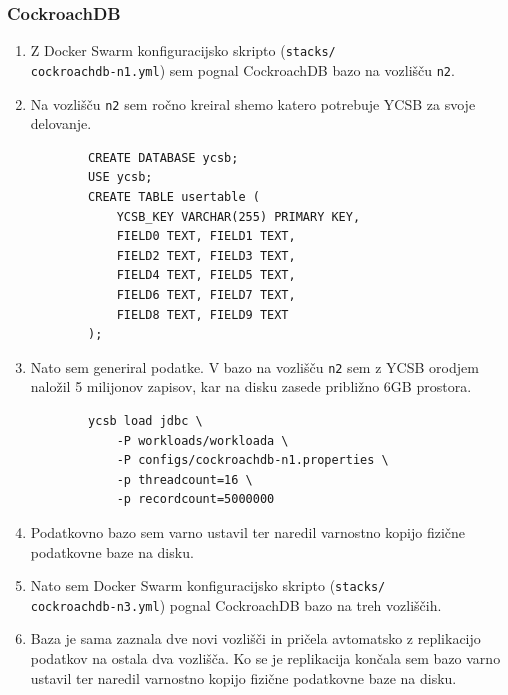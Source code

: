 \documentclass[a4paper, 12pt]{book}
\begin{document}
\subsubsection{CockroachDB}
\begin{enumerate}
    \item Z Docker Swarm konfiguracijsko skripto (\texttt{stacks/\\cockroachdb-n1.yml}) sem pognal CockroachDB bazo na vozlišču \texttt{n2}.
    \item Na vozlišču \texttt{n2} sem ročno kreiral shemo katero potrebuje YCSB za svoje delovanje.
    \begin{listing}[H]
    \begin{verbatim}
        CREATE DATABASE ycsb;
        USE ycsb;
        CREATE TABLE usertable (
            YCSB_KEY VARCHAR(255) PRIMARY KEY,
            FIELD0 TEXT, FIELD1 TEXT,
            FIELD2 TEXT, FIELD3 TEXT,
            FIELD4 TEXT, FIELD5 TEXT,
            FIELD6 TEXT, FIELD7 TEXT,
            FIELD8 TEXT, FIELD9 TEXT
        );
    \end{verbatim}
    \label{code-ycsb-schema-cockroach}
    \end{listing}
    \item Nato sem generiral podatke. V bazo na vozlišču \texttt{n2} sem z YCSB orodjem naložil 5 milijonov zapisov, kar na disku zasede približno 6GB prostora.
    \begin{listing}[H]
    \begin{verbatim}
        ycsb load jdbc \
            -P workloads/workloada \
            -P configs/cockroachdb-n1.properties \
            -p threadcount=16 \
            -p recordcount=5000000
    \end{verbatim}
    \label{code-ycsb-load-cockroach}
    \end{listing}
    \item Podatkovno bazo sem varno ustavil ter naredil varnostno kopijo fizične podatkovne baze na disku.
    \item Nato sem Docker Swarm konfiguracijsko skripto (\texttt{stacks/\\cockroachdb-n3.yml}) pognal CockroachDB bazo na treh vozliščih.
    \item Baza je sama zaznala dve novi vozlišči in pričela avtomatsko z replikacijo podatkov na ostala dva vozlišča. Ko se je replikacija končala sem bazo varno ustavil ter naredil varnostno kopijo fizične podatkovne baze na disku.
\end{enumerate}
\end{document}
